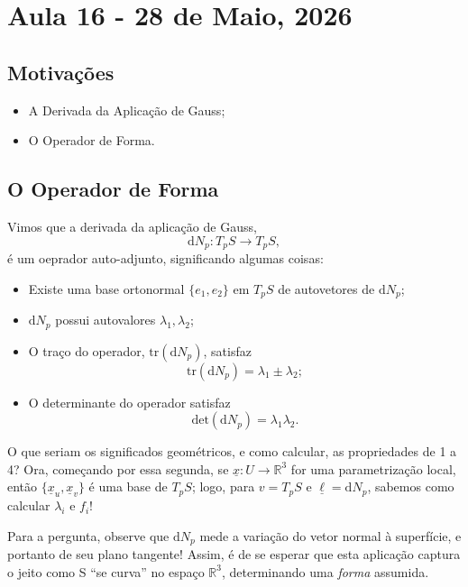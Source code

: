 \documentclass[../differential_geometry.tex]{subfiles}
\begin{document}
\section{Aula 16 - 28 de Maio, 2026}
\subsection{Motivações}
\begin{itemize}
	\item A Derivada da Aplicação de Gauss;
	\item O Operador de Forma.
\end{itemize}
\subsection{O Operador de Forma}
Vimos que a derivada da aplicação de Gauss,
\[
	\mathrm{d}N_{p}:T_pS\rightarrow T_pS,
\]
é um oeprador auto-adjunto, significando algumas coisas:
\begin{itemize}
	\item[1)] Existe uma base ortonormal \(\{e_1, e_2\}\) em \(T_pS\) de autovetores de \(\mathrm{d}N_p\);
	\item[2)] \(\mathrm{d}N_p\) possui autovalores \(\lambda_1, \lambda_2\);
	\item[3)] O traço do operador, \(\mathrm{tr}(\mathrm{d}N_p)\), satisfaz
	      \[
		      \mathrm{tr}(\mathrm{d}N_p) = \lambda_1 \pm \lambda_2;
	      \]
	\item[4)] O determinante do operador satisfaz
	      \[
		      \mathrm{det}(\mathrm{d}N_p) = \lambda_1\lambda_2.
	      \]
\end{itemize}
O que seriam os significados geométricos, e como calcular, as propriedades de 1 a 4? Ora, começando por essa segunda, se \(\underline{x}:U\rightarrow \mathbb{R}^{3}\) for uma parametrização local, então \(\{\underline{x}_u, \underline{x}_v\}\) é uma base de \(T_pS\); logo, para \(v = T_pS\) e \(\underline{\ell }=\mathrm{d}N_p\), sabemos como calcular \(\lambda_{i}\) e \(f_{i}\)!

Para a pergunta, observe que \(\mathrm{d}N_p\) mede a variação do vetor normal à superfície, e portanto de seu plano tangente! Assim, é de se esperar que esta aplicação captura o jeito como S ``se curva'' no espaço \(\mathbb{R}^{3}\), determinando uma \textit{forma} assumida.
\end{document}
